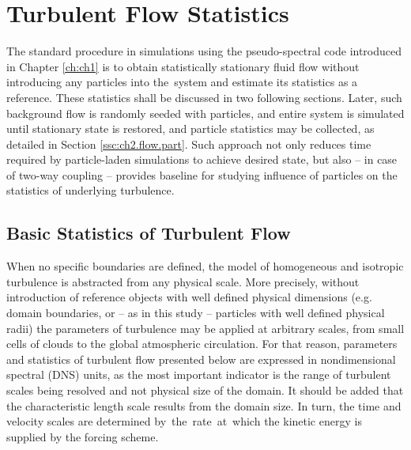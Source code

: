 \documentclass{pracamgren}
\begin{document}
\section{Turbulent Flow Statistics}
\label{sc:ch2.flow}

The standard procedure in simulations using the pseudo-spectral code introduced in Chapter \ref{ch:ch1} is to obtain statistically stationary fluid flow without introducing any particles into the~system and estimate its statistics as a reference.
These statistics shall be discussed in two following sections.
Later, such background flow is randomly seeded with particles, and entire system is simulated until stationary state is restored, and particle statistics may be collected, as detailed in Section \ref{ssc:ch2.flow.part}.
Such approach not only reduces time required by particle-laden simulations to achieve desired state, but also  -- in case of two-way coupling -- provides baseline for studying influence of particles on the statistics of underlying turbulence.



\subsection{Basic Statistics of Turbulent Flow}
\label{ssc:ch2.flow.bstat}

When no specific boundaries are defined, the model of homogeneous and isotropic turbulence is abstracted from any physical scale. 
More precisely, without introduction of reference objects with well defined physical dimensions (e.g. domain boundaries, or -- as in this study -- particles with well defined physical radii) the parameters of turbulence may be applied at arbitrary scales, from small cells of clouds to the global atmospheric circulation.
For that reason, parameters and statistics of turbulent flow presented below are expressed in nondimensional spectral (DNS) units, as the most important indicator is the range of turbulent scales being resolved and not physical size of the domain.
It should be added that the characteristic length scale results from the domain size. 
In turn, the time and velocity scales are determined by~the~rate~at~which the kinetic energy is supplied by the forcing scheme.
\end{document}
